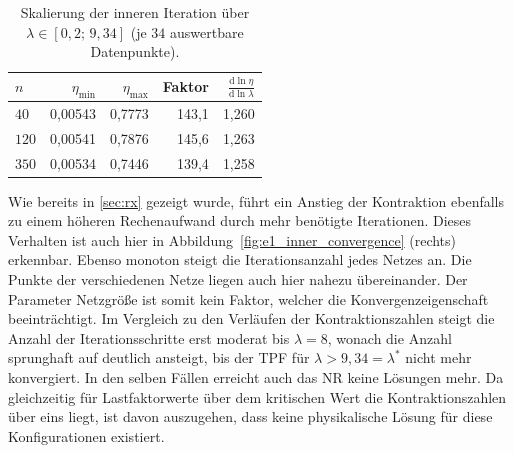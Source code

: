 \begin{table}[htbp]
	\centering
	\small
	\caption{Skalierung der inneren Iteration über $\lambda\in[0{,}2;\,9{,}34]$
		(je $34$ auswertbare Datenpunkte).}
	\label{tab:lam-inner}
	\begin{tabular}{lrrrr}
		\toprule
		$n$ & $\eta_{\min}$ & $\eta_{\max}$ & Faktor &
		$\frac{\mathrm{d}\ln\eta}{\mathrm{d}\ln\lambda}$ \\
		\midrule
		$40$  & 0,00543 & 0,7773 & 143,1 & 1,260 \\
		$120$ & 0,00541 & 0,7876 & 145,6 & 1,263 \\
		$350$ & 0,00534 & 0,7446 & 139,4 & 1,258 \\
		\bottomrule
	\end{tabular}
\end{table}


Wie bereits in \cref{sec:rx} gezeigt wurde, führt ein Anstieg der Kontraktion ebenfalls zu einem höheren Rechenaufwand durch mehr benötigte Iterationen. 
Dieses Verhalten ist auch hier in Abbildung~\ref{fig:e1_inner_convergence} (rechts) erkennbar. 
Ebenso monoton steigt die Iterationsanzahl jedes Netzes an. 
Die Punkte der verschiedenen Netze liegen auch hier nahezu übereinander.
Der Parameter Netzgröße ist somit kein Faktor, welcher die Konvergenzeigenschaft beeinträchtigt.
Im Vergleich zu den Verläufen der Kontraktionszahlen steigt die Anzahl der Iterationsschritte erst moderat bis $\lambda=8$, wonach die Anzahl sprunghaft auf deutlich ansteigt, bis der TPF für $\lambda>9,34=\lambda^*$ nicht mehr konvergiert.
In den selben Fällen erreicht auch das NR keine Lösungen mehr.
Da gleichzeitig für Lastfaktorwerte über dem kritischen Wert die Kontraktionszahlen über eins liegt, ist davon auszugehen, dass keine physikalische Lösung für diese Konfigurationen existiert.








